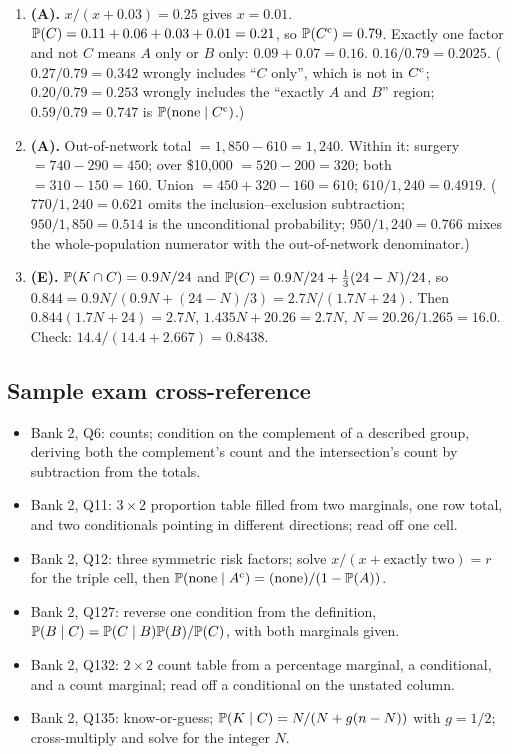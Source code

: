 \begin{enumerate}[label=\arabic*., nosep]
($0.216$ is the joint; $0.118$ is Standard--Claim; $0.167$ is the Premium marginal.)
\item \textbf{(A).} $x/(x + 0.03) = 0.25$ gives $x = 0.01$.
$\mathbb{P}(C) = 0.11 + 0.06 + 0.03 + 0.01 = 0.21$, so $\mathbb{P}(C^{\mathrm{c}}) = 0.79$.
Exactly one factor and not $C$ means $A$ only or $B$ only: $0.09 + 0.07 = 0.16$.
$0.16/0.79 = 0.2025$. ($0.27/0.79 = 0.342$ wrongly includes ``$C$ only'', which is
not in $C^{\mathrm{c}}$; $0.20/0.79 = 0.253$ wrongly includes the ``exactly $A$ and $B$'' region;
$0.59/0.79 = 0.747$ is $\mathbb{P}(\text{none} \mid C^{\mathrm{c}})$.)
\item \textbf{(A).} Out-of-network total $= 1{,}850 - 610 = 1{,}240$. Within it: surgery
$= 740 - 290 = 450$; over \$10{,}000 $= 520 - 200 = 320$; both $= 310 - 150 = 160$.
Union $= 450 + 320 - 160 = 610$; $610/1{,}240 = 0.4919$.
($770/1{,}240 = 0.621$ omits the inclusion--exclusion subtraction;
$950/1{,}850 = 0.514$ is the unconditional probability; $950/1{,}240 = 0.766$ mixes
the whole-population numerator with the out-of-network denominator.)
\item \textbf{(E).} $\mathbb{P}(K \cap C) = 0.9N/24$ and
$\mathbb{P}(C) = 0.9N/24 + \tfrac13 (24 - N)/24$, so
$0.844 = 0.9N/(0.9N + (24 - N)/3) = 2.7N/(1.7N + 24)$.
Then $0.844(1.7N + 24) = 2.7N$, $1.435N + 20.26 = 2.7N$, $N = 20.26/1.265 = 16.0$.
Check: $14.4/(14.4 + 2.667) = 0.8438$.
\end{enumerate}

\subsection{Sample exam cross-reference}

\begin{itemize}[nosep]
\item Bank 2, Q6: counts; condition on the complement of a described group, deriving both the complement's count and the intersection's count by subtraction from the totals.
\item Bank 2, Q11: $3 \times 2$ proportion table filled from two marginals, one row total, and two conditionals pointing in different directions; read off one cell.
\item Bank 2, Q12: three symmetric risk factors; solve $x/(x + \text{exactly two}) = r$ for the triple cell, then $\mathbb{P}(\text{none} \mid A^{\mathrm{c}}) = (\text{none})/(1 - \mathbb{P}(A))$.
\item Bank 2, Q127: reverse one condition from the definition, $\mathbb{P}(B \mid C) = \mathbb{P}(C \mid B)\mathbb{P}(B)/\mathbb{P}(C)$, with both marginals given.
\item Bank 2, Q132: $2 \times 2$ count table from a percentage marginal, a conditional, and a count marginal; read off a conditional on the unstated column.
\item Bank 2, Q135: know-or-guess; $\mathbb{P}(K \mid C) = N/(N + g(n - N))$ with $g = 1/2$; cross-multiply and solve for the integer $N$.
\end{itemize}

